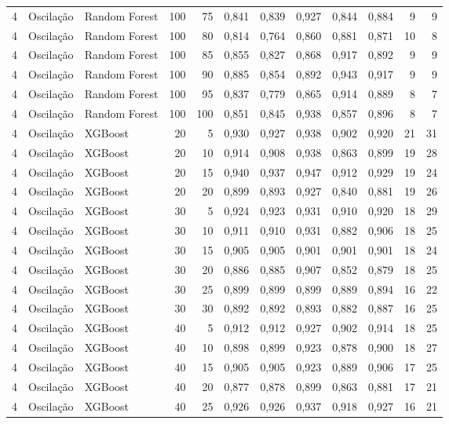 \begin{longtable}{@{}rllrrrrrrrrr@{}}
4 & Oscilação & Random Forest & 100 & 75 & 0,841 & 0,839 & 0,927 & 0,844 & 0,884 & 9 & 9 \\
4 & Oscilação & Random Forest & 100 & 80 & 0,814 & 0,764 & 0,860 & 0,881 & 0,871 & 10 & 8 \\
4 & Oscilação & Random Forest & 100 & 85 & 0,855 & 0,827 & 0,868 & 0,917 & 0,892 & 9 & 9 \\
4 & Oscilação & Random Forest & 100 & 90 & 0,885 & 0,854 & 0,892 & 0,943 & 0,917 & 9 & 9 \\
4 & Oscilação & Random Forest & 100 & 95 & 0,837 & 0,779 & 0,865 & 0,914 & 0,889 & 8 & 7 \\
4 & Oscilação & Random Forest & 100 & 100 & 0,851 & 0,845 & 0,938 & 0,857 & 0,896 & 8 & 7 \\
4 & Oscilação & XGBoost & 20 & 5 & 0,930 & 0,927 & 0,938 & 0,902 & 0,920 & 21 & 31 \\
4 & Oscilação & XGBoost & 20 & 10 & 0,914 & 0,908 & 0,938 & 0,863 & 0,899 & 19 & 28 \\
4 & Oscilação & XGBoost & 20 & 15 & 0,940 & 0,937 & 0,947 & 0,912 & 0,929 & 19 & 24 \\
4 & Oscilação & XGBoost & 20 & 20 & 0,899 & 0,893 & 0,927 & 0,840 & 0,881 & 19 & 26 \\
4 & Oscilação & XGBoost & 30 & 5 & 0,924 & 0,923 & 0,931 & 0,910 & 0,920 & 18 & 29 \\
4 & Oscilação & XGBoost & 30 & 10 & 0,911 & 0,910 & 0,931 & 0,882 & 0,906 & 18 & 25 \\
4 & Oscilação & XGBoost & 30 & 15 & 0,905 & 0,905 & 0,901 & 0,901 & 0,901 & 18 & 24 \\
4 & Oscilação & XGBoost & 30 & 20 & 0,886 & 0,885 & 0,907 & 0,852 & 0,879 & 18 & 25 \\
4 & Oscilação & XGBoost & 30 & 25 & 0,899 & 0,899 & 0,899 & 0,889 & 0,894 & 16 & 22 \\
4 & Oscilação & XGBoost & 30 & 30 & 0,892 & 0,892 & 0,893 & 0,882 & 0,887 & 16 & 25 \\
4 & Oscilação & XGBoost & 40 & 5 & 0,912 & 0,912 & 0,927 & 0,902 & 0,914 & 18 & 25 \\
4 & Oscilação & XGBoost & 40 & 10 & 0,898 & 0,899 & 0,923 & 0,878 & 0,900 & 18 & 27 \\
4 & Oscilação & XGBoost & 40 & 15 & 0,905 & 0,905 & 0,923 & 0,889 & 0,906 & 17 & 25 \\
4 & Oscilação & XGBoost & 40 & 20 & 0,877 & 0,878 & 0,899 & 0,863 & 0,881 & 17 & 21 \\
4 & Oscilação & XGBoost & 40 & 25 & 0,926 & 0,926 & 0,937 & 0,918 & 0,927 & 16 & 21 \\

\end{longtable}
